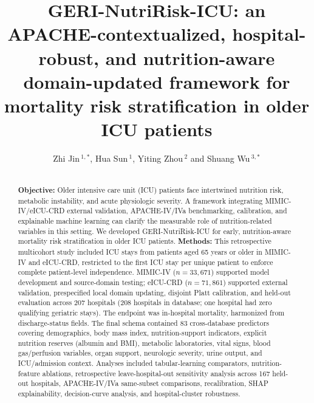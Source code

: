 \documentclass[utf8]{FrontiersinVancouver}
\newcommand{\re}[1]{#1}
\def\firstAuthorLast{Jin {et~al.}}
\def\Authors{Zhi Jin\,$^{1,*}$, Hua Sun\,$^{1}$, Yiting Zhou\,$^{2}$ and Shuang Wu\,$^{3,*}$}
\begin{document}
\onecolumn
{}

\title[GERI-NutriRisk-ICU]{GERI-NutriRisk-ICU: an APACHE-contextualized, hospital-robust, and nutrition-aware domain-updated framework for mortality risk stratification in older ICU patients}

\author[\firstAuthorLast]{\Authors}
\address{}
\correspondance{}

\maketitle

\begin{abstract}
\section{}
\textbf{Objective:} Older intensive care unit (ICU) patients face intertwined nutrition risk, metabolic instability, and acute physiologic severity. A framework integrating MIMIC-IV/eICU-CRD external validation, APACHE-IV/IVa benchmarking, calibration, and explainable machine learning can clarify the measurable role of nutrition-related variables in this setting. We developed GERI-NutriRisk-ICU for early, nutrition-aware mortality risk stratification in older ICU patients.
\textbf{Methods:} \re{This retrospective multicohort study included ICU stays from patients aged 65 years or older in MIMIC-IV and eICU-CRD, restricted to the first ICU stay per unique patient to enforce complete patient-level independence. MIMIC-IV ($n=33,671$) supported model development and source-domain testing; eICU-CRD ($n=71,861$) supported external validation, prespecified local domain updating, disjoint Platt calibration, and held-out evaluation across 207 hospitals (208 hospitals in database; one hospital had zero qualifying geriatric stays). The endpoint was in-hospital mortality, harmonized from discharge-status fields. The final schema contained 83 cross-database predictors covering demographics, body mass index, nutrition-support indicators, explicit nutrition reserves (albumin and BMI), metabolic laboratories, vital signs, blood gas/perfusion variables, organ support, neurologic severity, urine output, and ICU/admission context. Analyses included tabular-learning comparators, nutrition-feature ablations, retrospective leave-hospital-out sensitivity analysis across 167 held-out hospitals, APACHE-IV/IVa same-subset comparisons, recalibration, SHAP explainability, decision-curve analysis, and hospital-cluster robustness.}

\end{abstract}
\end{document}
